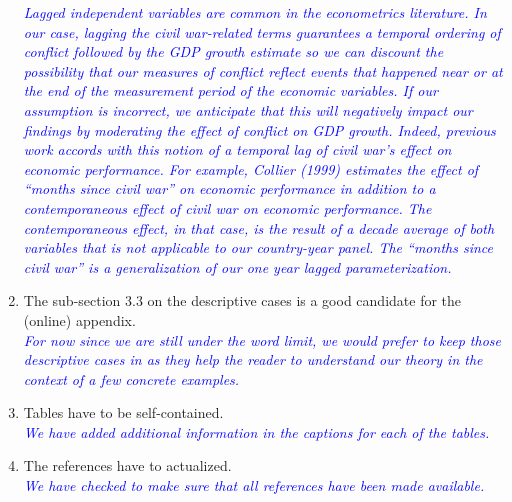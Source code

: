 \begin{enumerate}
\textcolor{blue}{\emph{
	Lagged independent variables are common in the econometrics literature. In our case, lagging the civil war-related terms guarantees a temporal ordering of conflict followed by the GDP growth estimate so we can discount the possibility that our measures of conflict reflect events that happened near or at the end of the measurement period of the economic variables. If our assumption is incorrect, we anticipate that this will negatively impact our findings by moderating the effect of conflict on GDP growth. Indeed, previous work accords with this notion of a temporal lag of civil war's effect on economic performance. For example, Collier (1999) estimates the effect of ``months since civil war'' on economic performance in addition to a contemporaneous effect of civil war on economic performance. The contemporaneous effect, in that case, is the result of a decade average of both variables that is not applicable to our country-year panel. The ``months since civil war'' is a generalization of our one year lagged parameterization.
}} \\

\item The sub-section 3.3 on the descriptive cases is a good candidate for the (online) appendix. \\

\textcolor{blue}{\emph{
	For now since we are still under the word limit, we would prefer to keep those descriptive cases in as they help the reader to understand our theory in the context of a few concrete examples. 
}} \\

\item Tables have to be self-contained. \\

\textcolor{blue}{\emph{
	We have added additional information in the captions for each of the tables.
}} \\

\item The references have to actualized. \\

\textcolor{blue}{\emph{
	We have checked to make sure that all references have been made available.
}} \\

\end{enumerate}